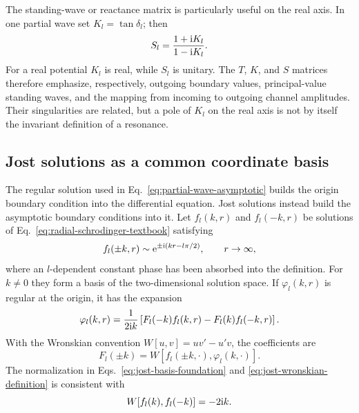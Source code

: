 The standing-wave or reactance matrix is particularly useful on the real
axis.  In one partial wave set $K_l=\tan\delta_l$; then
\begin{equation}
  S_l=\frac{1+\mathrm{i} K_l}{1-\mathrm{i} K_l} .
  \label{eq:S-K-relation}
\end{equation}
For a real potential $K_l$ is real, while $S_l$ is unitary.  The $T$, $K$,
and $S$ matrices therefore emphasize, respectively, outgoing boundary
values, principal-value standing waves, and the mapping from incoming to
outgoing channel amplitudes.  Their singularities are related, but a pole of
$K_l$ on the real axis is not by itself the invariant definition of a
resonance.

\subsection{Jost solutions as a common coordinate basis}
\label{subsec:jost-foundation}

The regular solution used in Eq.~\eqref{eq:partial-wave-asymptotic} builds the
origin boundary condition into the differential equation.  Jost solutions
instead build the asymptotic boundary conditions into it.  Let
$f_l(k,r)$ and $f_l(-k,r)$ be solutions of
Eq.~\eqref{eq:radial-schrodinger-textbook} satisfying
\begin{equation}
  f_l(\pm k,r)\sim\mathrm{e}^{\pm\mathrm{i}(kr-l\pi/2)},
  \qquad r\to\infty,
  \label{eq:jost-foundation-asymptotic}
\end{equation}
where an $l$-dependent constant phase has been absorbed into the definition.
For $k\ne0$ they form a basis of the two-dimensional solution space.  If
$\varphi_l(k,r)$ is regular at the origin, it has the expansion
\begin{equation}
  \varphi_l(k,r)
  =\frac{1}{2\mathrm{i} k}
  \left[F_l(-k)f_l(k,r)-F_l(k)f_l(-k,r)\right] .
  \label{eq:jost-basis-foundation}
\end{equation}
With the Wronskian convention
$W[u,v]=uv'-u'v$, the coefficients are
\begin{equation}
  F_l(\pm k)=W[f_l(\pm k,\cdot),\varphi_l(k,\cdot)] .
  \label{eq:jost-wronskian-definition}
\end{equation}
The normalization in Eqs.~\eqref{eq:jost-basis-foundation} and
\eqref{eq:jost-wronskian-definition} is consistent with
\begin{equation*}
  W[f_l(k),f_l(-k)]=-2\mathrm{i} k.
\end{equation*}

